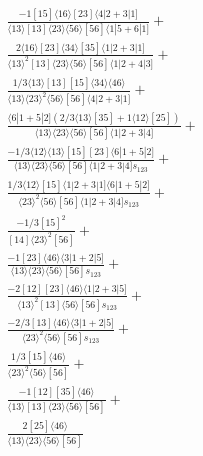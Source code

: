 \documentclass[varwidth, border=5pt]{standalone}
\begin{document}
\begin{my}
$\begin{gathered}
\scriptscriptstyle\frac{-1[15]⟨16⟩[23]⟨4|2+3|1]}{⟨13⟩[13]⟨23⟩⟨56⟩[56]⟨1|5+6|1]}+\\
\scriptscriptstyle\frac{2⟨16⟩[23]⟨34⟩[35]⟨1|2+3|1]}{⟨13⟩^2[13]⟨23⟩⟨56⟩[56]⟨1|2+4|3]}+\\
\scriptscriptstyle\frac{1/3⟨13⟩[13][15]⟨34⟩⟨46⟩}{⟨13⟩⟨23⟩^2⟨56⟩[56]⟨4|2+3|1]}+\\
\scriptscriptstyle\frac{⟨6|1+5|2](2/3⟨13⟩[35]+1⟨12⟩[25])}{⟨13⟩⟨23⟩⟨56⟩[56]⟨1|2+3|4]}+\\
\scriptscriptstyle\frac{-1/3⟨12⟩⟨13⟩[15][23]⟨6|1+5|2]}{⟨13⟩⟨23⟩⟨56⟩[56]⟨1|2+3|4]s_{123}}+\\
\scriptscriptstyle\frac{1/3⟨12⟩[15]⟨1|2+3|1]⟨6|1+5|2]}{⟨23⟩^2⟨56⟩[56]⟨1|2+3|4]s_{123}}+\\
\scriptscriptstyle\frac{-1/3[15]^2}{[14]⟨23⟩^2[56]}+\\
\scriptscriptstyle\frac{-1[23]⟨46⟩⟨3|1+2|5]}{⟨13⟩⟨23⟩⟨56⟩[56]s_{123}}+\\
\scriptscriptstyle\frac{-2[12][23]⟨46⟩⟨1|2+3|5]}{⟨13⟩^2[13]⟨56⟩[56]s_{123}}+\\
\scriptscriptstyle\frac{-2/3[13]⟨46⟩⟨3|1+2|5]}{⟨23⟩^2⟨56⟩[56]s_{123}}+\\
\scriptscriptstyle\frac{1/3[15]⟨46⟩}{⟨23⟩^2⟨56⟩[56]}+\\
\scriptscriptstyle\frac{-1[12][35]⟨46⟩}{⟨13⟩[13]⟨23⟩⟨56⟩[56]}+\\
\scriptscriptstyle\frac{2[25]⟨46⟩}{⟨13⟩⟨23⟩⟨56⟩[56]}\phantom{+}
\end{gathered}$
\end{my}
\end{document}
